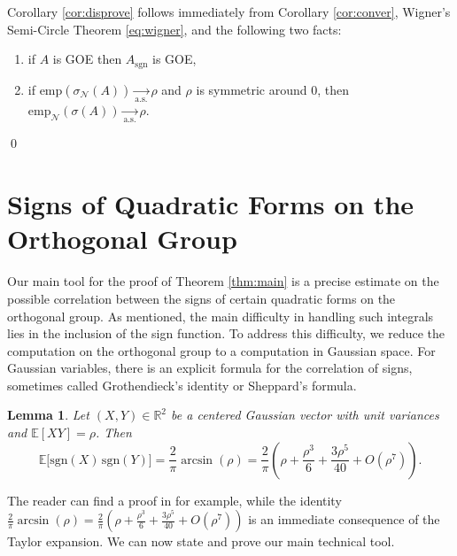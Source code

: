 \documentclass[reqno]{amsart}
\numberwithin{equation}{section}
\newcommand\E{\mathbb{E}}
\newcommand\R{\mathbb{R}}
\newtheorem{lemma}[theorem]{Lemma}
\begin{document}
Corollary \ref{cor:disprove} follows immediately from Corollary \ref{cor:conver}, Wigner's Semi-Circle Theorem \eqref{eq:wigner}, and the following two facts:
\begin{enumerate}
    \item if $A$ is GOE then $A_{\mathrm{sgn}}$ is GOE,
    \item if $\mathrm{emp}(\sigma_{\mathcal{N}}(A)) \underset{\mathrm{a.s.}}{\longrightarrow} \rho$ and $\rho$ is symmetric around $0$, then $\mathrm{emp}_{\mathcal{N}}(\sigma(A)) \underset{\mathrm{a.s.}}{\longrightarrow} \rho$. 
\end{enumerate}\qed
\section{Signs of Quadratic Forms on the Orthogonal Group}
Our main tool for the proof of Theorem \ref{thm:main} is a precise estimate on the possible correlation between the signs of certain quadratic forms on the orthogonal group. As mentioned, the main difficulty in handling such integrals lies in the inclusion of the sign function. To address this difficulty, we reduce the computation on the orthogonal group to a computation in Gaussian space. For Gaussian variables, there is an explicit formula for the correlation of signs, sometimes called Grothendieck's identity or Sheppard's formula.
\begin{lemma}\label{lem: signArcsine}
Let $(X,Y)\in \R^2$ be a centered Gaussian vector with unit variances and $\E[XY] = \rho$.
Then
\[
\E\!\big[\mathrm{sgn}(X)\,\mathrm{sgn}(Y)\big]
=\frac{2}{\pi}\arcsin(\rho)=\frac{2}{\pi}\left(\rho+\frac{\rho^3}{6}+\frac{3\rho^5}{40}+O(\rho^7)\right).
\]
\end{lemma}
The reader can find a proof in \cite[Lemma 3.2]{goemans1995improved} for example, while the identity $\frac{2}{\pi}\arcsin(\rho)=\frac{2}{\pi}\left(\rho+\frac{\rho^3}{6}+\frac{3\rho^5}{40}+O(\rho^7)\right)$ is an immediate consequence of the Taylor expansion.
 We can now state and prove our main technical tool.
\end{document}
